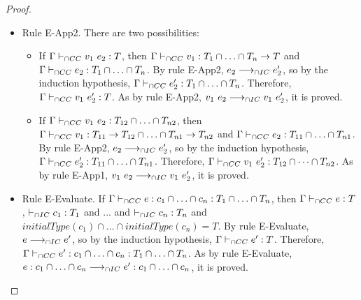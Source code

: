 \documentclass[a4paper]{article}
\begin{document}
\begin{proof}
\begin{itemize}
    \item Rule E-App2. There are two possibilities:
    \begin{itemize}
        \item If $\Gamma \vdash_{\cap CC} v_1\ e_2 : T$, then $\Gamma \vdash_{\cap CC} v_1 : T_1 \cap \ldots \cap T_n \rightarrow T$ and $\Gamma \vdash_{\cap CC} e_2 : T_1 \cap \ldots \cap T_n$.
        By rule E-App2, $e_2 \longrightarrow_{\cap IC} e_2'$, so by the induction hypothesis, $\Gamma \vdash_{\cap CC} e_2' : T_1 \cap \ldots \cap T_n$.
        Therefore, $\Gamma \vdash_{\cap CC} v_1\ e_2' : T$.
        As by rule E-App2, $v_1\ e_2 \longrightarrow_{\cap IC} v_1\ e_2'$, it is proved.
        \item If $\Gamma \vdash_{\cap CC} v_1\ e_2 : T_{12} \cap \ldots \cap T_{n2}$, then $\Gamma \vdash_{\cap CC} v_1 : T_{11} \rightarrow T_{12} \cap \ldots \cap T_{n1} \rightarrow T_{n2}$ and $\Gamma \vdash_{\cap CC} e_2 : T_{11} \cap \ldots \cap T_{n1}$.
        By rule E-App2, $e_2 \longrightarrow_{\cap IC} e_2'$, so by the induction hypothesis, $\Gamma \vdash_{\cap CC} e_2' : T_{11} \cap \ldots \cap T_{n1}$.
        Therefore, $\Gamma \vdash_{\cap CC} v_1\ e_2' : T_{12} \cap \dots \cap T_{n2}$.
        As by rule E-App1, $v_1\ e_2 \longrightarrow_{\cap IC} v_1\ e_2'$, it is proved.
    \end{itemize}
    \item Rule E-Evaluate. If $\Gamma \vdash_{\cap CC} e : c_1 \cap \ldots \cap c_n : T_1 \cap \ldots \cap T_n$, then $\Gamma \vdash_{\cap CC} e : T$, $\vdash_{\cap IC} c_1 : T_1$ and ... and $\vdash_{\cap IC} c_n : T_n$ and $initialType(c_1) \cap \ldots \cap initialType(c_n) = T$.
    By rule E-Evaluate, $e \longrightarrow_{\cap IC} e'$, so by the induction hypothesis, $\Gamma \vdash_{\cap CC} e' : T$.
    Therefore, $\Gamma \vdash_{\cap CC} e' : c_1 \cap \ldots \cap c_n : T_1 \cap \ldots \cap T_n$.
    As by rule E-Evaluate, $e : c_1 \cap \ldots \cap c_n \longrightarrow_{\cap IC} e' : c_1 \cap \ldots \cap c_n$, it is proved.
\end{itemize}
\end{proof}
\end{document}
